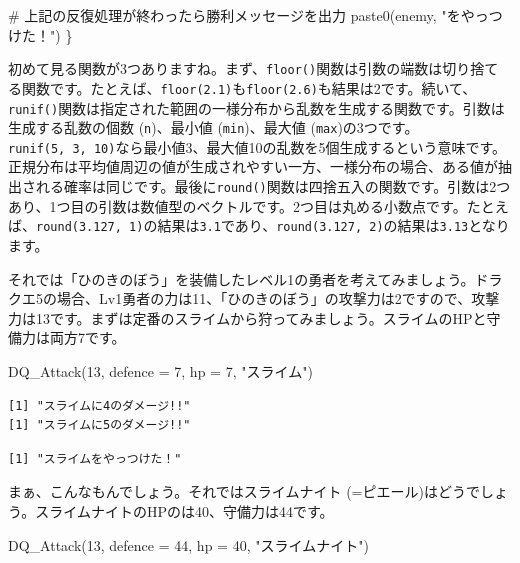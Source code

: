 \documentclass[
  a4paper,
  pandoc,
  ja=standard,
  jafont=haranoaji]{bxjsbook}
\newenvironment{Shaded}{\begin{snugshade}}{\end{snugshade}}
\newcommand{\AttributeTok}[1]{\textcolor[rgb]{0.00,0.48,0.65}{#1}}
\newcommand{\CommentTok}[1]{\textcolor[rgb]{0.37,0.37,0.37}{#1}}
\newcommand{\DecValTok}[1]{\textcolor[rgb]{0.68,0.00,0.00}{#1}}
\newcommand{\FunctionTok}[1]{\textcolor[rgb]{0.28,0.35,0.67}{#1}}
\newcommand{\NormalTok}[1]{\textcolor[rgb]{0.00,0.48,0.65}{#1}}
\newcommand{\StringTok}[1]{\textcolor[rgb]{0.13,0.47,0.30}{#1}}
\begin{document}
\begin{Shaded}
\begin{Highlighting}[numbers=left,,]
  \CommentTok{\# 上記の反復処理が終わったら勝利メッセージを出力}
  \FunctionTok{paste0}\NormalTok{(enemy, }\StringTok{"をやっつけた！"}\NormalTok{)}
\NormalTok{\}}
\end{Highlighting}
\end{Shaded}

初めて見る関数が3つありますね。まず、\texttt{floor()}関数は引数の端数は切り捨てる関数です。たとえば、\texttt{floor(2.1)}も\texttt{floor(2.6)}も結果は2です。続いて、\texttt{runif()}関数は指定された範囲の一様分布から乱数を生成する関数です。引数は生成する乱数の個数
(\texttt{n})、最小値 (\texttt{min})、最大値
(\texttt{max})の3つです。\texttt{runif(5,\ 3,\ 10)}なら最小値3、最大値10の乱数を5個生成するという意味です。正規分布は平均値周辺の値が生成されやすい一方、一様分布の場合、ある値が抽出される確率は同じです。最後に\texttt{round()}関数は四捨五入の関数です。引数は2つあり、1つ目の引数は数値型のベクトルです。2つ目は丸める小数点です。たとえば、\texttt{round(3.127,\ 1)}の結果は\texttt{3.1}であり、\texttt{round(3.127,\ 2)}の結果は\texttt{3.13}となります。

それでは「ひのきのぼう」を装備したレベル1の勇者を考えてみましょう。ドラクエ5の場合、Lv1勇者の力は11、「ひのきのぼう」の攻撃力は2ですので、攻撃力は13です。まずは定番のスライムから狩ってみましょう。スライムのHPと守備力は両方7です。

\begin{Shaded}
\begin{Highlighting}[numbers=left,,]
\FunctionTok{DQ\_Attack}\NormalTok{(}\DecValTok{13}\NormalTok{, }\AttributeTok{defence =} \DecValTok{7}\NormalTok{, }\AttributeTok{hp =} \DecValTok{7}\NormalTok{, }\StringTok{"スライム"}\NormalTok{)}
\end{Highlighting}
\end{Shaded}

\begin{verbatim}
[1] "スライムに4のダメージ!!"
[1] "スライムに5のダメージ!!"
\end{verbatim}

\begin{verbatim}
[1] "スライムをやっつけた！"
\end{verbatim}

まぁ、こんなもんでしょう。それではスライムナイト
(=ピエール)はどうでしょう。スライムナイトのHPのは40、守備力は44です。

\begin{Shaded}
\begin{Highlighting}[numbers=left,,]
\FunctionTok{DQ\_Attack}\NormalTok{(}\DecValTok{13}\NormalTok{, }\AttributeTok{defence =} \DecValTok{44}\NormalTok{, }\AttributeTok{hp =} \DecValTok{40}\NormalTok{, }\StringTok{"スライムナイト"}\NormalTok{)}
\end{Highlighting}
\end{Shaded}
\end{document}
